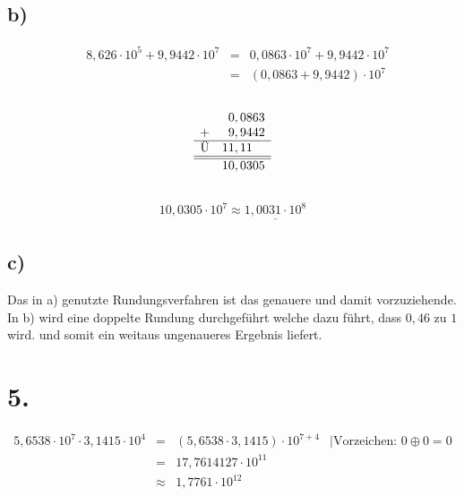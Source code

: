 \documentclass[a4paper]{scrartcl}
\begin{document}
	\subsection{b)}
		\[
		\begin{array}{rrcl}
			&8,626 \cdot 10^5  + 9,9442 \cdot 10^7 &=& 0,0863 \cdot 10^7 + 9,9442 \cdot 10^7 \\
			&&=&(0,0863 + 9,9442) \cdot 10^7
		\end{array}
		\] \\	
		\[
		\begin{array}{cl}
				 	 &\ \, 0,0863  \\
					+&\ \, 9,9442   \\ \hline
			\text{Ü} & 1 1,1 1\ \ \\ \hline\hline
			&10,0305
		\end{array}
		\] \\
		\[
		\begin{array}{rcl}
			10,0305\cdot 10^7 \approx \underline{1,0031 \cdot 10^8}
		\end{array}
		\]

	\subsection{c)}
		Das in a) genutzte Rundungsverfahren ist das genauere und damit vorzuziehende.
		In b) wird eine doppelte Rundung durchgeführt welche dazu führt, dass \(0,46\) zu \(1\) wird. 
		und somit ein weitaus ungenaueres Ergebnis liefert.

\section{5.}
	\[
	\begin{array}{rcll}
			5,6538 \cdot 10^7 \cdot 3,1415 \cdot 10^4 &=& (5,6538 \cdot 3,1415) \cdot 10^{7+4}&\mid \text{Vorzeichen: } 0\oplus 0 = 0 \\
			&=&17,7614127 \cdot 10^{11} \\
			&\approx & 1,7761 \cdot 10^{12}
	\end{array}
	\]
\end{document}
